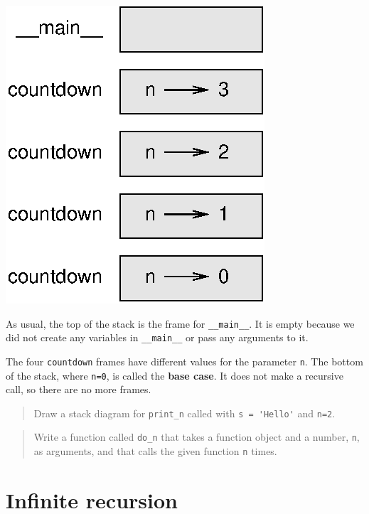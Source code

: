 \documentclass[10pt]{book}
\begin{document}
\beforefig
\centerline{\includegraphics{figs/stack2.eps}}
\afterfig

As usual, the top of the stack is the frame for \verb"__main__".
It is empty because we did not create any variables in 
\verb"__main__" or pass any arguments to it.


The four {\tt countdown} frames have different values for the
parameter {\tt n}.  The bottom of the stack, where {\tt n=0}, is
called the {\bf base case}.  It does not make a recursive call, so
there are no more frames.

\begin{quote}
Draw a stack diagram for \verb"print_n" called with
\verb"s = 'Hello'" and {\tt n=2}.
\end{quote}

\begin{quote}
Write a function called \verb"do_n" that takes a function
object and a number, {\tt n}, as arguments, and that calls
the given function {\tt n} times.
\end{quote}



\section{Infinite recursion}
\end{document}
